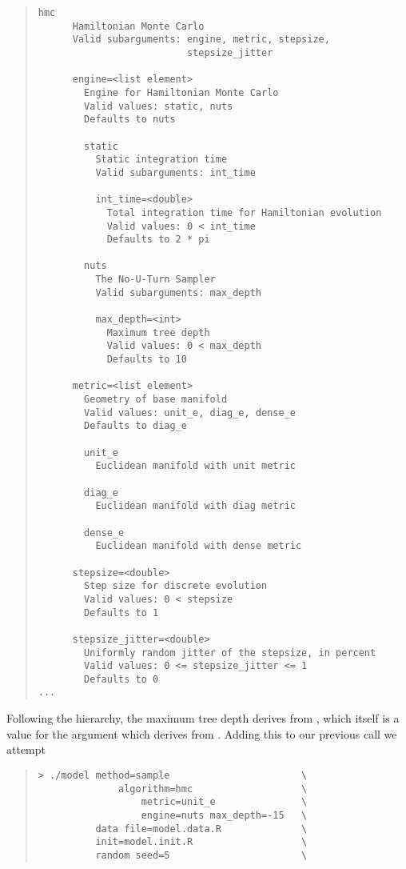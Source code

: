 \begin{quote}
\begin{Verbatim}[fontsize=\small]
    hmc
      Hamiltonian Monte Carlo
      Valid subarguments: engine, metric, stepsize, 
                          stepsize_jitter

      engine=<list element>
        Engine for Hamiltonian Monte Carlo
        Valid values: static, nuts
        Defaults to nuts

        static
          Static integration time
          Valid subarguments: int_time

          int_time=<double>
            Total integration time for Hamiltonian evolution
            Valid values: 0 < int_time
            Defaults to 2 * pi

        nuts
          The No-U-Turn Sampler
          Valid subarguments: max_depth

          max_depth=<int>
            Maximum tree depth
            Valid values: 0 < max_depth
            Defaults to 10

      metric=<list element>
        Geometry of base manifold
        Valid values: unit_e, diag_e, dense_e
        Defaults to diag_e

        unit_e
          Euclidean manifold with unit metric

        diag_e
          Euclidean manifold with diag metric

        dense_e
          Euclidean manifold with dense metric

      stepsize=<double>
        Step size for discrete evolution
        Valid values: 0 < stepsize
        Defaults to 1

      stepsize_jitter=<double>
        Uniformly random jitter of the stepsize, in percent
        Valid values: 0 <= stepsize_jitter <= 1
        Defaults to 0
...
\end{Verbatim}
\end{quote}
%
Following the hierarchy, the maximum tree depth derives from ,
which itself is a value for the argument  which derives from
.  Adding this to our previous call we attempt
%
\begin{quote}
\begin{Verbatim}[fontshape=sl]
> ./model method=sample                       \
              algorithm=hmc                   \
                  metric=unit_e               \
                  engine=nuts max_depth=-15   \
          data file=model.data.R              \
          init=model.init.R                   \
          random seed=5                       \
\end{Verbatim}
\end{quote}
